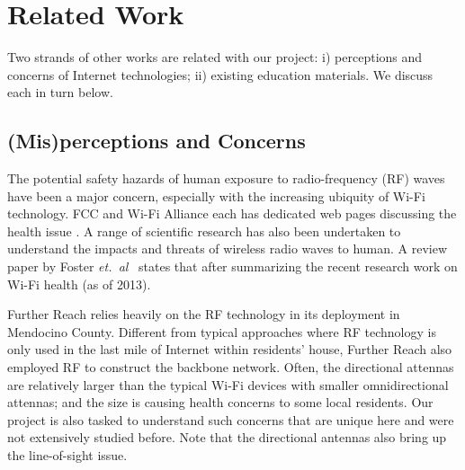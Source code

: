 \section{Related Work}
\label{sec:related-work}

Two strands of other works are related with our project: i) perceptions and
concerns of Internet technologies; ii) existing education materials. We discuss
each in turn below.

\subsection{(Mis)perceptions and Concerns}
\label{sec:conc-misp}

The potential safety hazards of human exposure to radio-frequency (RF) waves
have been a major concern, especially with the increasing ubiquity of Wi-Fi
technology. FCC and Wi-Fi Alliance each has dedicated web pages discussing the
health issue \cite{fcc2015radio, wifi2015health}. A range of scientific research
has also been undertaken to understand the impacts and threats of wireless radio
waves to human. A review paper by Foster {\em et.~al}~\cite{foster2013wi}
states that 
after summarizing the recent research work on Wi-Fi health (as of 2013).

Further Reach relies heavily on the RF technology in its deployment in Mendocino
County. Different from typical approaches where RF technology is only used in
the last mile of Internet within residents' house, Further Reach also employed
RF to construct the backbone network. Often, the directional attennas are
relatively larger than the typical Wi-Fi devices with smaller omnidirectional
attennas; and the size is causing health concerns to some local residents. Our
project is also tasked to understand such concerns that are unique here and were
not extensively studied before. Note that the directional antennas also bring up
the line-of-sight issue.

